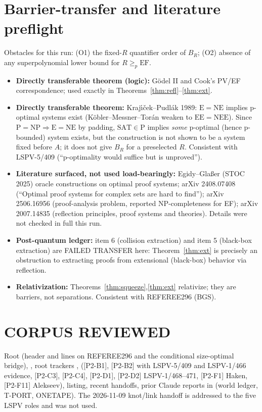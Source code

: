 \documentclass[11pt]{article}
\theoremstyle{definition}
\theoremstyle{remark}
\begin{document}
\section{Barrier-transfer and literature preflight}
Obstacles for this run: (O1) the fixed-$R$ quantifier order of $B_R$; (O2) absence of any
superpolynomial lower bound for $R\ge_p\mathrm{EF}$.
\begin{itemize}
\item \textbf{Directly transferable theorem (logic):} G\"odel II and Cook's PV/EF correspondence;
used exactly in Theorems~\ref{thm:refl}--\ref{thm:ext}.
\item \textbf{Directly transferable theorem:} Kraj\'{\i}\v{c}ek--Pudl\'ak 1989: $\mathrm{E}=\mathrm{NE}$
implies p-optimal systems exist (K\"obler--Messner--Tor\'an weaken to $\mathrm{EE}=\mathrm{NEE}$).
Since $\mathrm P=\mathrm{NP}\Rightarrow\mathrm E=\mathrm{NE}$ by padding, $\mathrm{SAT}\in\mathrm P$ implies
\emph{some} p-optimal (hence p-bounded) system exists, but the construction is not shown to be a system
fixed before $A$; it does not give $B_R$ for a preselected $R$. Consistent with LSPV-5/409
(``p-optimality would suffice but is unproved'').
\item \textbf{Literature surfaced, not used load-bearingly:} Egidy--Gla\ss er (STOC 2025) oracle
constructions on optimal proof systems; arXiv 2408.07408 (``Optimal proof systems for complex sets are
hard to find''); arXiv 2506.16956 (proof-analysis problem, reported NP-completeness for EF);
arXiv 2007.14835 (reflection principles, proof systems and theories). Details were not checked in full this run.
\item \textbf{Post-quantum ledger:} item 6 (collision extraction) and item 5 (black-box extraction) are
FAILED TRANSFER here: Theorem~\ref{thm:ext} is precisely an obstruction to extracting proofs from
extensional (black-box) behavior via reflection.
\item \textbf{Relativization:} Theorems~\ref{thm:squeeze},\ref{thm:ext} relativize; they are barriers,
not separations. Consistent with REFEREE296 (BGS).
\end{itemize}

\section{CORPUS REVIEWED}
Root  (header and lines on REFEREE296 and the conditional size-optimal bridge),
, root trackers ,  ([P2-B1], [P2-B2] with LSPV-5/409
and LSPV-1/466 evidence, [P2-C3], [P2-C4], [P2-D1], [P2-D2] LSPV-1/468--471, [P2-F1] Haken,
[P2-F11] Alekseev),  listing,  recent handoffs,
prior Claude reports in  (world ledger, T-PORT, ONETAPE).
The 2026-11-09 knot/link handoff is addressed to the five LSPV roles and was not used.
\end{document}
